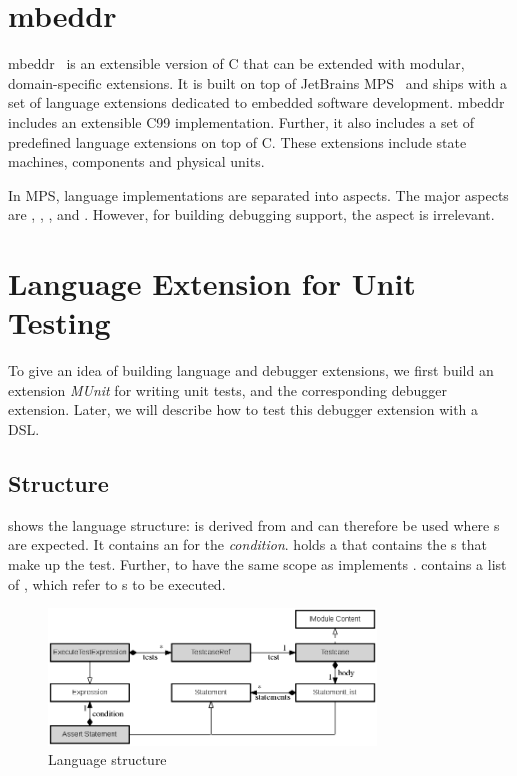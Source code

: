 \section{mbeddr}

mbeddr~\cite{Voelter:2012:MEC:2384716.2384767} is an extensible version of C
that can be extended with modular, domain-specific extensions. 
It is built on top of JetBrains \ac{MPS}~\cite{2012_mps_homepage}
and ships with a set of language extensions dedicated to embedded software
development. mbeddr includes an extensible C99 implementation. Further, 
it also includes a set of predefined language extensions on top of C. These 
extensions include state machines, components and physical units.

In \ac{MPS}, language implementations are separated into aspects. 
The major aspects  are , 
, ,  and . However, for
building debugging support, the  aspect is irrelevant.

\section{Language Extension for Unit Testing}

To give an idea of building language and debugger extensions, we first 
build an extension \emph{MUnit} for writing 
unit tests, and the corresponding debugger extension. Later,
we will describe how to test this debugger extension with a \ac{DSL}. 

\subsection{Structure}

 shows the language structure:
 is derived from  and can therefore
be used where s are expected. It contains an 
for the \emph{condition}.
 holds a  that contains the s
that make up the test. Further, to have the same scope as 
 implements .
 contains a list of
, which refer to s to be executed.

\begin{figure}[h]
  \vspace{-4mm}
  \centering
    \includegraphics[width=8.7cm]{./figures/unitTestingLangUML2.png} 
    \vspace{-4mm} 
    \caption{Language structure}
  \label{fig:UnitTestStructure}
  \vspace{-5mm}
\end{figure}

